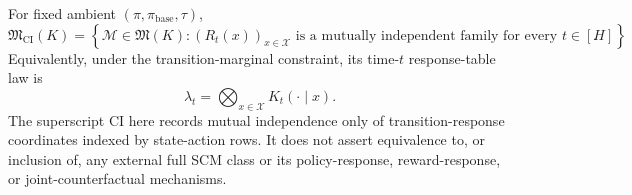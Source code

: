 For fixed ambient \((\pi,\pi_{\mathrm{base}},\tau)\),
\[
 \mathfrak M_{\mathrm{CI}}(K)=\left\{\mathcal M\in\mathfrak M(K):
 (R_t(x))_{x\in\mathcal X}\text{ is a mutually independent family for every }t\in[H]\right\}.
\]
Equivalently, under the transition-marginal constraint, its time-\(t\) response-table law is
\[
 \lambda_t=\bigotimes_{x\in\mathcal X}K_t(\cdot\mid x).
\]
The superscript \(\mathrm{CI}\) here records mutual independence only of transition-response coordinates indexed by state-action rows.  It does not assert equivalence to, or inclusion of, any external full SCM class or its policy-response, reward-response, or joint-counterfactual mechanisms.